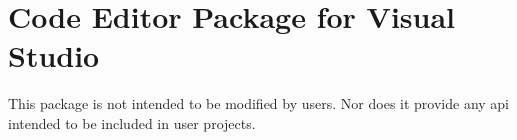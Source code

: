 \chapter{Code Editor Package for Visual Studio}
\hypertarget{md__library_2_package_cache_2com_8unity_8ide_8visualstudio_0d2_80_822_2_documentation_0i_2_r_e_a_d_m_e}{}\label{md__library_2_package_cache_2com_8unity_8ide_8visualstudio_0d2_80_822_2_documentation_0i_2_r_e_a_d_m_e}
\label{md__library_2_package_cache_2com_8unity_8ide_8visualstudio_0d2_80_822_2_documentation_0i_2_r_e_a_d_m_e_autotoc_md312}%
%
 This package is not intended to be modified by users. Nor does it provide any api intended to be included in user projects. 